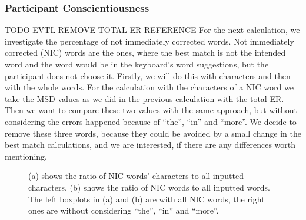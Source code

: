 \subsubsection{Participant Conscientiousness}TODO EVTL REMOVE TOTAL ER REFERENCE
For the next calculation, we investigate the percentage of not immediately corrected words. Not immediately corrected (NIC) words are the ones, where the best match is not the intended word and the word would be in the keyboard's word suggestions, but the participant does not choose it. Firstly, we will do this with characters and then with the whole words. For the calculation with the characters of a NIC word we take the MSD values as we did in the previous calculation with the total ER. Then we want to compare these two values with the same approach, but without considering the errors happened because of ``the'', ``in'' and ``more''. We decide to remove these three words, because they could be avoided by a small change in the best match calculations, and we are interested, if there are any differences worth mentioning.
\iffalse
\begin{figure}[H]
    \makebox[\textwidth][c]{
        \centering
        \subbottom[Not corrected characters with wpm\label{fig:error_user:error_user1}]{\texttt{[image: user\_error3\_1.pdf]}}\hspace{-3.0em}
        \subbottom[As (a), but without ``the'', ``in'' and ``more''\label{fig:error_user:error_user2}]{\texttt{[image: user\_error3\_2.pdf]}}
    }
    \makebox[\textwidth][c]{
        \centering
        \subbottom[Not corrected words with wpm\label{fig:error_user:error_user3}]{\texttt{[image: user\_error3\_3.pdf]}}\hspace{-3.0em}
        \subbottom[As (c), but without ``the'', ``in'' and ``more''\label{fig:error_user:error_user4}]{\texttt{[image: user\_error3\_4.pdf]}}
    }
    \caption{(a) shows the percentage of characters calculated with the MSD from wrong words, that were not immediately corrected with the word suggestions. (b) is the same as (a) but errors from ``the'', ``in'' and ``more'' are ignored. (c) is the same as (a) but not with characters, but with the words as whole. (d) is the same as (b) but not with characters, but with the words as a whole}
    \label{fig:error_user}
\end{figure}
\fi
\begin{figure}[H]
    \centering
    \caption{(a) shows the ratio of NIC words' characters to all inputted characters. (b) shows the ratio of NIC words to all inputted words. The left boxplots in (a) and (b) are with all NIC words, the right ones are without considering ``the'', ``in'' and ``more''.}
    \label{fig:error_user}
\end{figure}

